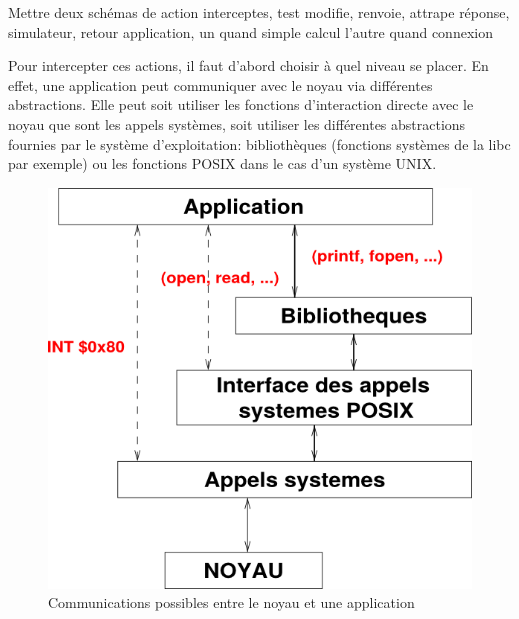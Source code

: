 {\color{red} Mettre deux schémas de action interceptes, test modifie, renvoie,
  attrape réponse, simulateur, retour application, un quand simple calcul
  l'autre quand connexion}

Pour intercepter ces actions, il faut d'abord choisir à quel niveau se placer.
 En effet, une application peut communiquer avec le noyau via différentes
abstractions. Elle peut soit utiliser les fonctions d'interaction directe avec
le noyau que sont les appels systèmes, soit utiliser les différentes
abstractions fournies par le système d'exploitation: bibliothèques (fonctions
systèmes de la libc par exemple) ou les fonctions POSIX dans le cas d'un système
UNIX.

\begin{figure}[H]
 \centering
 \includegraphics[scale=0.5]{Pictures/png/Communication_application_noyau_v1.png}
 \caption{Communications possibles entre le noyau et une application}
 \label{AS_Communication}
\end{figure}


